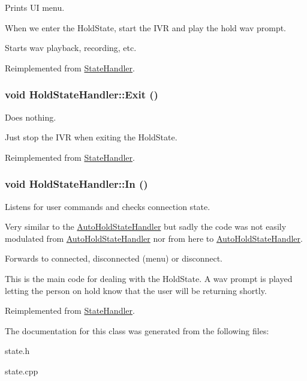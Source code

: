 Prints UI menu. 

When we enter the HoldState, start the IVR and play the hold wav prompt.

Starts wav playback, recording, etc.

Reimplemented from \hyperlink{classStateHandler_c08036e743cf5172d6931cf3b6d321c6}{StateHandler}.\hypertarget{classHoldStateHandler_eb6c0ab072533f903b0ccb58e957c65a}{
\subsubsection[{Exit}]{\setlength{\rightskip}{0pt plus 5cm}void HoldStateHandler::Exit ()}}
\label{classHoldStateHandler_eb6c0ab072533f903b0ccb58e957c65a}


Does nothing. 

Just stop the IVR when exiting the HoldState.

Reimplemented from \hyperlink{classStateHandler_5ce0f2cb3d4a9f5aca137d47eac75c1e}{StateHandler}.\hypertarget{classHoldStateHandler_5f9d46a1e14f04831c30399960d43387}{
\subsubsection[{In}]{\setlength{\rightskip}{0pt plus 5cm}void HoldStateHandler::In ()}}
\label{classHoldStateHandler_5f9d46a1e14f04831c30399960d43387}


Listens for user commands and checks connection state. 

Very similar to the \hyperlink{classAutoHoldStateHandler}{AutoHoldStateHandler} but sadly the code was not easily modulated from \hyperlink{classAutoHoldStateHandler}{AutoHoldStateHandler} nor from here to \hyperlink{classAutoHoldStateHandler}{AutoHoldStateHandler}.

Forwards to connected, disconnected (menu) or disconnect.

This is the main code for dealing with the HoldState. A wav prompt is played letting the person on hold know that the user will be returning shortly. 

Reimplemented from \hyperlink{classStateHandler_cee16f855e7354d21abafa47acd1046c}{StateHandler}.

The documentation for this class was generated from the following files:\begin{CompactItemize}
\item 
state.h\item 
state.cpp\end{CompactItemize}
